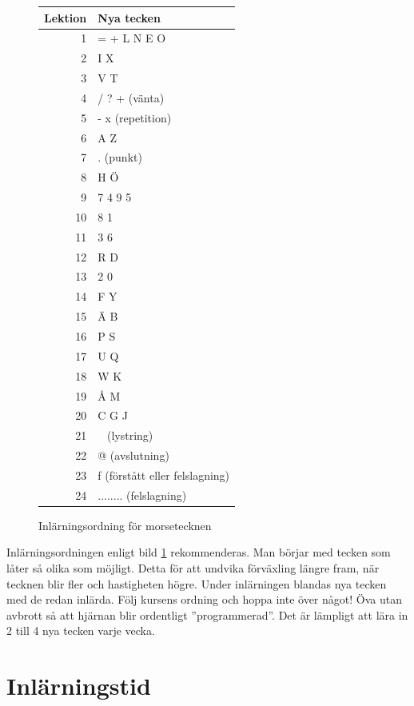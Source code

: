 \begin{figure}
  \begin{tabular}{|r|l|}
    \hline
    \textbf{Lektion} & \textbf{Nya tecken} \\ \hline
    1 & = + L N E O \\
    2 & I X \\
    3 & V T \\
    4 & / ? + (vänta) \\
    5 & - x (repetition) \\
    6 & A Z \\
    7 & . (punkt) \\
    8 & H Ö \\
    9 & 7 4 9 5 \\
    10 & 8 1 \\
    11 & 3 6 \\
    12 & R D \\
    13 & 2 0 \\
    14 & F Y \\
    15 & Ä B \\
    16 & P S \\
    17 & U Q \\
    18 & W K \\
    19 & Å M \\
    20 & C G J \\
    21 & ~ (lystring) \\
    22 & @ (avslutning) \\
    23 & f (förstått eller felslagning) \\
    24 & ........ (felslagning) \\
    \hline
  \end{tabular}
  \caption{Inlärningsordning för morsetecknen}
  \label{fig:morse_ordning}
\end{figure}

Inlärningsordningen enligt bild \ref{fig:morse_ordning} rekommenderas.
Man börjar med tecken som låter så olika som möjligt.
Detta för att undvika förväxling längre fram, när tecknen blir fler och
hastigheten högre.
Under inlärningen blandas nya tecken med de redan inlärda.
Följ kursens ordning och hoppa inte över något!
Öva utan avbrott så att hjärnan blir ordentligt ''programmerad''.
Det är lämpligt att lära in 2 till 4 nya tecken varje vecka.

\section{Inlärningstid}

